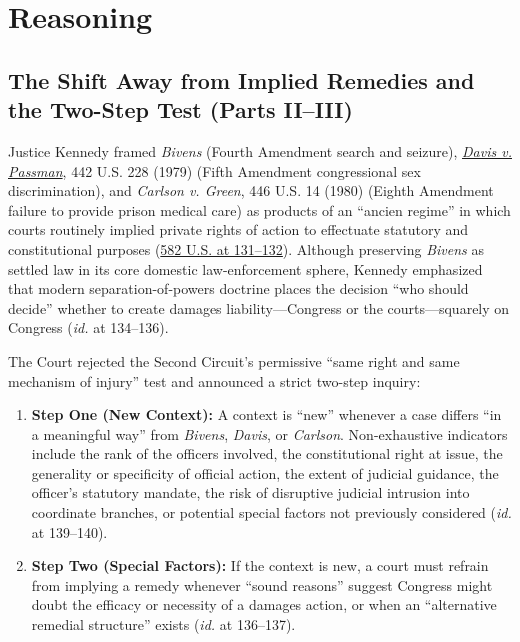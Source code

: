 \documentclass[12pt]{article}
\begin{document}
\section{Reasoning}

\subsection{The Shift Away from Implied Remedies and the Two-Step Test (Parts II--III)}

Justice Kennedy framed \textit{Bivens} (Fourth Amendment search and seizure), \href{https://supreme.justia.com/cases/federal/us/442/228/}{\textit{Davis v. Passman}}, 442 U.S. 228 (1979) (Fifth Amendment congressional sex discrimination), and \textit{Carlson v. Green}, 446 U.S. 14 (1980) (Eighth Amendment failure to provide prison medical care) as products of an ``ancien regime'' in which courts routinely implied private rights of action to effectuate statutory and constitutional purposes (\href{https://www.law.cornell.edu/supremecourt/text/15-1358}{582 U.S. at 131--132}). Although preserving \textit{Bivens} as settled law in its core domestic law-enforcement sphere, Kennedy emphasized that modern separation-of-powers doctrine places the decision ``who should decide'' whether to create damages liability---Congress or the courts---squarely on Congress (\textit{id.} at 134--136).

The Court rejected the Second Circuit's permissive ``same right and same mechanism of injury'' test and announced a strict two-step inquiry:
\begin{enumerate}
  \item \textbf{Step One (New Context):} A context is ``new'' whenever a case differs ``in a meaningful way'' from \textit{Bivens}, \textit{Davis}, or \textit{Carlson}. Non-exhaustive indicators include the rank of the officers involved, the constitutional right at issue, the generality or specificity of official action, the extent of judicial guidance, the officer's statutory mandate, the risk of disruptive judicial intrusion into coordinate branches, or potential special factors not previously considered (\textit{id.} at 139--140).
  \item \textbf{Step Two (Special Factors):} If the context is new, a court must refrain from implying a remedy whenever ``sound reasons'' suggest Congress might doubt the efficacy or necessity of a damages action, or when an ``alternative remedial structure'' exists (\textit{id.} at 136--137).
\end{enumerate}
\end{document}
